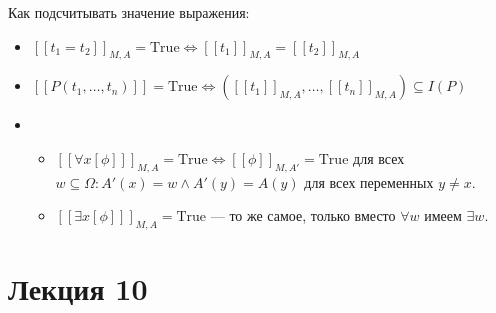 \documentclass[12pt]{article}
\let\sus\subseteq
\theoremstyle{definition}
\theoremstyle{plain}
\theoremstyle{remark}
\begin{document}
Как подсчитывать значение выражения:
\begin{itemize}
  \item $[[t_1 = t_2]]_{M,A} = \mathrm{True} \iff [[t_1]]_{M,A} = [[t_2]]_{M,A}$

  \item $[[P(t_1, \dots, t_n)]] = \mathrm{True} \iff ([[t_1]]_{M,A},
    \dots, [[t_n]]_{M,A}) \sus I(P)$

  \item
    \begin{itemize}
      \item $[[\forall x[\phi]]]_{M,A} = \mathrm{True} \iff
        [[\phi]]_{M,A'} = \mathrm{True}$ для всех $w \sus \Omega \colon
        A'(x) = w \land A'(y) = A(y)$ для всех переменных $y \neq x$.

      \item $[[\exists x[\phi]]]_{M,A} = \mathrm{True}$ --- то же
        самое, только вместо $\forall w$ имеем $\exists w$.
    \end{itemize}
\end{itemize}

\pagebreak

\section{Лекция 10}
\end{document}
